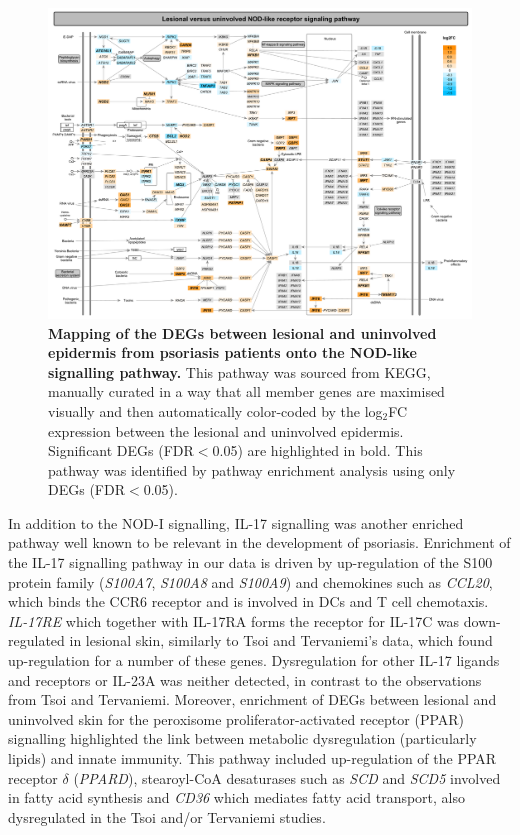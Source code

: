 \begin{landscape}
\begin{figure}[H]
\centering
\includegraphics[width=\textwidth]{./Results2/pdfs/PS_lesional_uninvolved_all_NOD_like_pathway}
\caption[Mapping of the DEGs between lesional and uninvolved epidermis from psoriasis patients onto the NOD-like signalling pathway.]{\textbf{Mapping of the DEGs between lesional and uninvolved epidermis from psoriasis patients onto the NOD-like signalling pathway.} This pathway was sourced from KEGG, manually curated in a way that all member genes are maximised visually and then automatically color-coded by the log$_2$FC expression between the lesional and uninvolved epidermis. Significant DEGs (FDR$<$0.05) are highlighted in bold. This pathway was identified by pathway enrichment analysis using only DEGs (FDR$<$0.05).}
\label{figure:PS_lesional_vs_uninvolved_HIF_pathway}
\end{figure}
\end{landscape}


In addition to the NOD-I signalling, IL-17 signalling was another enriched pathway well known to be relevant in the development of psoriasis. Enrichment of the IL-17 signalling pathway in our data is driven by up-regulation of the S100 protein family (\textit{S100A7}, \textit{S100A8} and \textit{S100A9}) and chemokines such as \textit{CCL20}, which binds the CCR6 receptor and is involved in DCs and T cell chemotaxis. \textit{IL-17RE} which together with IL-17RA forms the receptor for IL-17C was down-regulated in lesional skin, similarly to Tsoi and Tervaniemi's data, which found up-regulation for a number of these genes. Dysregulation for other IL-17 ligands and receptors or IL-23A was neither detected, in contrast to the observations from Tsoi and Tervaniemi. Moreover, enrichment of DEGs between lesional and uninvolved skin for the peroxisome proliferator-activated receptor (PPAR) signalling highlighted the link between metabolic dysregulation (particularly lipids) and innate immunity. This pathway included up-regulation of the PPAR receptor $\delta$ (\textit{PPARD}), stearoyl-CoA desaturases such as \textit{SCD} and \textit{SCD5} involved in fatty acid synthesis and \textit{CD36} which mediates fatty acid transport, also dysregulated in the Tsoi and/or Tervaniemi studies.

